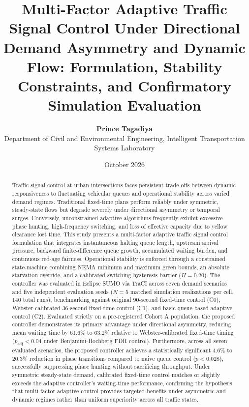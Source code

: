 \documentclass[11pt,journal,onecolumn]{article}
\title{\textbf{Multi-Factor Adaptive Traffic Signal Control Under Directional Demand Asymmetry and Dynamic Flow: Formulation, Stability Constraints, and Confirmatory Simulation Evaluation}}
\author{
    \textbf{Prince Tagadiya} \\
    Department of Civil and Environmental Engineering, Intelligent Transportation Systems Laboratory
}
\date{October 2026}
\begin{document}
\maketitle

\begin{abstract}
Traffic signal control at urban intersections faces persistent trade-offs between dynamic responsiveness to fluctuating vehicular queues and operational stability across varied demand regimes. Traditional fixed-time plans perform reliably under symmetric, steady-state flows but degrade severely under directional asymmetry or temporal surges. Conversely, unconstrained adaptive algorithms frequently exhibit excessive phase hunting, high-frequency switching, and loss of effective capacity due to yellow clearance lost time. This study presents a multi-factor adaptive traffic signal control formulation that integrates instantaneous halting queue length, upstream arrival pressure, backward finite-difference queue growth, accumulated waiting burden, and continuous red-age fairness. Operational stability is enforced through a constrained state-machine combining NEMA minimum and maximum green bounds, an absolute starvation override, and a calibrated switching hysteresis barrier ($H = 0.20$). The controller was evaluated in Eclipse SUMO via TraCI across seven demand scenarios and five independent evaluation seeds ($N = 5$ matched simulation realizations per cell, 140 total runs), benchmarking against original 90-second fixed-time control (C0), Webster-calibrated 36-second fixed-time control (C1), and basic queue-based adaptive control (C2). Evaluated strictly on a pre-registered Cohort A population, the proposed controller demonstrates its primary advantage under directional asymmetry, reducing mean waiting time by 61.6\% to 63.2\% relative to Webster-calibrated fixed-time timing ($p_{\text{adj}} < 0.04$ under Benjamini-Hochberg FDR control). Furthermore, across all seven evaluated scenarios, the proposed controller achieves a statistically significant 4.6\% to 20.3\% reduction in phase transitions compared to naive queue control ($p < 0.028$), successfully suppressing phase hunting without sacrificing throughput. Under symmetric steady-state demand, calibrated fixed-time control matches or slightly exceeds the adaptive controller's waiting-time performance, confirming the hypothesis that multi-factor adaptive control provides targeted benefits under asymmetric and dynamic regimes rather than uniform superiority across all traffic states.
\end{abstract}
\end{document}
